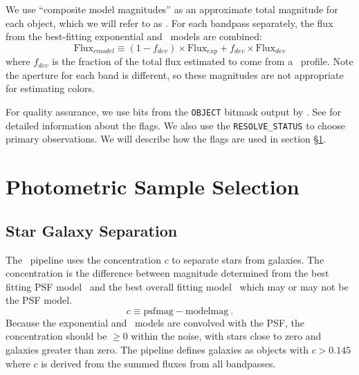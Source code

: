 \documentclass[preprint]{aastex}
\begin{document}
We use ``composite model magnitudes'' as an approximate total magnitude for
each object, which we will refer to as \cmodelmag.  For each bandpass
separately, the flux from the best-fitting exponential and \devauc\ models are
combined:
\begin{equation}
\textrm{Flux}_{cmodel} \equiv (1-f_{dev})\times \textrm{Flux}_{exp} + f_{dev} \times \textrm{Flux}_{dev}
\end{equation}
where $f_{dev}$ is the fraction of the total flux estimated to come from a
\devauc\ profile\citep{dr7photo}.  Note the aperture for each band is
different, so these magnitudes are not appropriate for estimating colors.

For quality assurance, we use bits from the \texttt{OBJECT} bitmask output by
\photo.  See \citet{dr7flags} for detailed information about the flags.    We
also use the \texttt{RESOLVE\_STATUS} \citep{dr7resolve} to choose primary
observations.  We will describe how the flags are used in section \S \ref{sec:select}.

    

\section{Photometric Sample Selection} \label{sec:select}

\subsection{Star Galaxy Separation}

The \photo\ pipeline uses the concentration $c$ to separate stars from
galaxies.  The concentration is the difference between magnitude determined
from the best fitting PSF model \psfmag\ and the best overall fitting model 
\modelmag\ which may or may not be the PSF model.
\begin{equation}
c \equiv \textrm{psfmag} - \textrm{modelmag}~.
\end{equation}
Because the exponential and \devauc\ models are convolved with the PSF, the
concentration should be $\ge 0$ within the noise, with stars close to zero and
galaxies greater than zero.  The pipeline defines galaxies as objects with $c >
0.145$ \citep{dr7classify} where $c$ is derived from the summed fluxes from all
bandpasses.  
\end{document}
